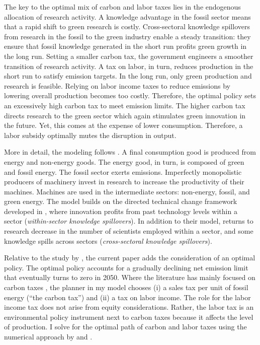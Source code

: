 The key to the optimal mix of carbon and labor taxes lies in the endogenous allocation of research activity. A knowledge advantage in the fossil sector means that a rapid shift to green research is costly. Cross-sectoral knowledge spillovers from research in the fossil to the green industry enable a steady transition: they ensure that fossil knowledge generated in the short run profits green growth in the long run. Setting a smaller carbon tax, the government  engineers a smoother transition of research activity. A tax on labor, in turn, reduces production in the short run to satisfy emission targets. In the long run, only green production and research is feasible. Relying on labor income taxes to reduce emissions by lowering overall production becomes too costly. Therefore, the optimal policy sets an excessively high carbon tax to meet emission limits. The higher carbon tax directs research to the green sector which again stimulates green innovation in the future. Yet, this comes at the expense of lower consumption. Therefore, a labor subsidy optimally mutes the disruption in output.

More in detail, the modeling follows \cite{Fried2018ClimateAnalysis}. A final consumption good is produced from energy and non-energy goods. The energy good, in turn, is composed of green and fossil energy. The fossil sector exerts emissions. Imperfectly monopolistic producers of machinery invest in research to increase the productivity of their machines. Machines are used in the intermediate sectors: non-energy, fossil, and green energy.  The model builds on the directed technical change framework developed in \cite{Acemoglu2012TheChange}, where innovation profits from past technology levels within a sector (\textit{within-sector knowledge spillovers}). In addition to their model, returns to research decrease in the number of scientists employed within a sector, and some knowledge spills across sectors (\textit{cross-sectoral knowledge spillovers}).

Relative to the study by \cite{Fried2018ClimateAnalysis}, the current paper adds the consideration of an optimal policy. The optimal policy accounts for a gradually declining  net emission limit that eventually turns to zero in 2050. Where the literature  has mainly focused on carbon taxes \citep{Fried2018ClimateAnalysis, Barrage2019OptimalPolicy}, the planner in my model chooses (i) a sales tax per unit of fossil energy (“the carbon tax”) and (ii) a tax on labor income. The role for the labor income tax does not arise from equity considerations. Rather, the labor tax is an environmental policy instrument next to carbon taxes because it affects the level of production.  I solve for the optimal path of carbon and labor taxes using the numerical approach by  \cite{Jones1993OptimalGrowth} and \cite{Barrage2019OptimalPolicy}.

